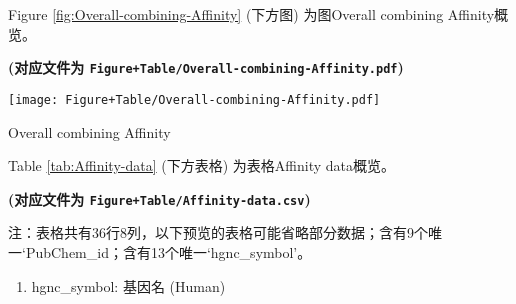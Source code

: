 \documentclass[
]{article}
\providecommand{\tightlist}{%
  \setlength{\itemsep}{0pt}\setlength{\parskip}{0pt}}
\begin{document}
\begin{center}\vspace{1.5cm}\end{center}

Figure \ref{fig:Overall-combining-Affinity} (下方图) 为图Overall combining Affinity概览。

\textbf{(对应文件为 \texttt{Figure+Table/Overall-combining-Affinity.pdf})}

\def\@captype{figure}
\begin{center}
\texttt{[image: Figure+Table/Overall-combining-Affinity.pdf]}
\caption{Overall combining Affinity}\label{fig:Overall-combining-Affinity}
\end{center}

\begin{center}\vspace{1.5cm}\end{center}

\begin{center}\vspace{1.5cm}\end{center}

Table \ref{tab:Affinity-data} (下方表格) 为表格Affinity data概览。

\textbf{(对应文件为 \texttt{Figure+Table/Affinity-data.csv})}

\begin{center}\begin{tcolorbox}[colback=gray!10, colframe=gray!50, width=0.9\linewidth, arc=1mm, boxrule=0.5pt]注：表格共有36行8列，以下预览的表格可能省略部分数据；含有9个唯一`PubChem\_id；含有13个唯一`hgnc\_symbol'。
\end{tcolorbox}
\end{center}
\begin{center}\begin{tcolorbox}[colback=gray!10, colframe=gray!50, width=0.9\linewidth, arc=1mm, boxrule=0.5pt]\begin{enumerate}\tightlist
\item hgnc\_symbol:  基因名 (Human)
\end{enumerate}\end{tcolorbox}
\end{center}
\end{document}
